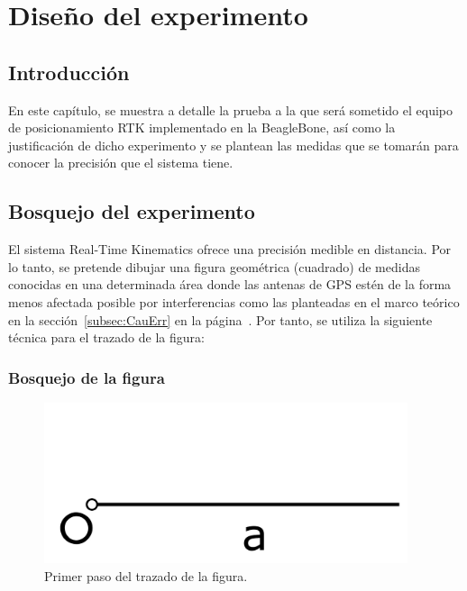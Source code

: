 
\chapter{Diseño del experimento}
\label{Chap:DisExp} %


\section{Introducción}

En este capítulo, se muestra a detalle la prueba a la que será sometido el equipo de posicionamiento RTK implementado en la BeagleBone, así como la justificación de dicho experimento y se plantean las medidas que se tomarán para conocer la precisión que el sistema tiene.

\section{Bosquejo del experimento}

El sistema Real-Time Kinematics ofrece una precisión medible en distancia. Por lo tanto, se pretende dibujar una figura geométrica (cuadrado) de medidas conocidas en una determinada área donde las antenas de GPS estén de la forma menos afectada posible por interferencias como las planteadas en el marco teórico en la sección~\ref{subsec:CauErr} en la página~\pageref{subsec:CauErr}. Por tanto, se utiliza la siguiente técnica para el trazado de la figura:

\subsection{Bosquejo de la figura}

\begin{figure}[H]
\centering
\includegraphics[width=0.95\textwidth]{Figures/Cuad1}
\caption[Primer paso del trazado de la figura.]{Primer paso del trazado de la figura.}
\label{fig:TrazFig1}
\end{figure}

